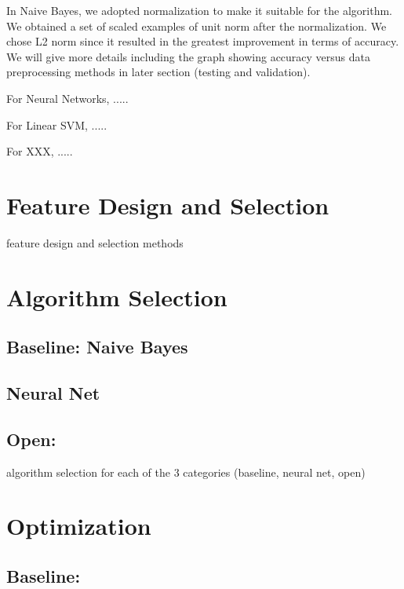 \documentclass{acm_proc_article-sp}
\begin{document}
In Naive Bayes, we adopted normalization to  make it suitable for the algorithm. We obtained a set of scaled examples of unit norm after the normalization. We chose L2 norm since it resulted in the greatest improvement in terms of accuracy. We will give more details including the graph showing accuracy versus data preprocessing methods in later section (testing and validation).

For Neural Networks, ..... 

For Linear SVM, .....

For XXX, ..... 









\section{Feature Design and Selection}
feature design and selection methods


\section{Algorithm Selection}

\subsection{Baseline: Naive Bayes}
\cite{pineaul5}

\subsection{Neural Net}

\subsection{Open: }
algorithm selection for each of the 3 categories (baseline, neural net, open)

\section{Optimization}

\subsection{Baseline: }
\end{document}
